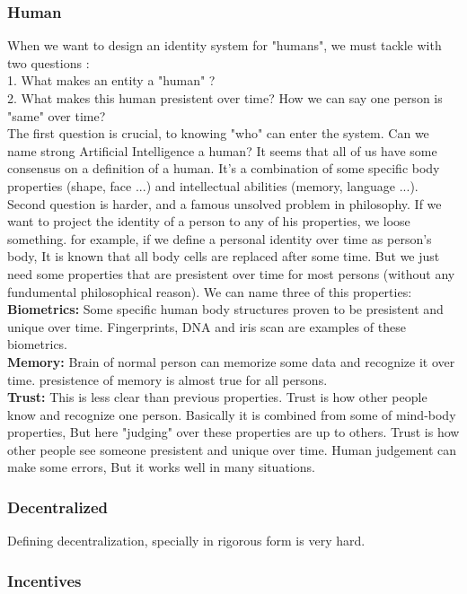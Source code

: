 \documentclass{article}
\begin{document}
\subsubsection{Human}
When we want to design an identity system for "humans", we must tackle with two questions :
\\
1. What makes an entity a "human" ?
\\
2. What makes this human presistent over time? How we can say one person is "same" over time?
\\
The first question is crucial, to knowing "who" can enter the system. Can we name strong Artificial Intelligence a human? It seems that all of us have some consensus on a definition of a human. It's a combination of some specific body properties (shape, face ...) and intellectual abilities (memory, language ...). 
\\
Second question is harder, and a famous unsolved problem in philosophy. If we want to project the identity of a person to any of his properties, we loose something. for example, if we define a personal identity over time as person's body, It is known that all body cells are replaced after some time. But we just need some properties that are presistent over time for most persons (without any fundumental philosophical reason). We can name three of this properties: 
\\
\textbf{Biometrics:} Some specific human body structures proven to be presistent and unique over time. Fingerprints, DNA and iris scan are examples of these biometrics.
\\
\textbf{Memory:} Brain of normal person can memorize some data and recognize it over time. presistence of memory is almost true for all persons.
\\
\textbf{Trust:} This is less clear than previous properties. Trust is how other people know and recognize one person. Basically it is combined from some of mind-body properties, But here "judging" over these properties are up to others. Trust is how other people see someone presistent and unique over time. Human judgement can make some errors, But it works well in many situations.


\subsubsection{Decentralized}

Defining decentralization, specially in rigorous form is very hard.
\subsubsection{Incentives}
\end{document}
